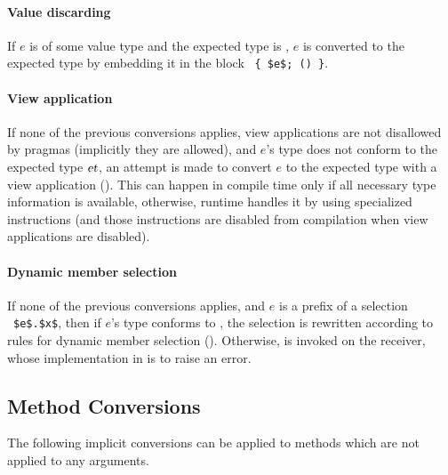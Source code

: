 \paragraph{Value discarding}
If $e$ is of some value type and the expected type is , $e$ is converted to the expected type by embedding it in the block ~\lstinline!{ $e$; () }!. 

\paragraph{View application}
If none of the previous conversions applies, view applications are not disallowed by pragmas (implicitly they are allowed), and $e$'s type does not conform to the expected type $\mbox{\sl et}$, an attempt is made to convert $e$ to the expected type with a view application (). This can happen in compile time only if all necessary type information is available, otherwise, runtime handles it by using specialized instructions (and those instructions are disabled from compilation when view applications are disabled). 

\paragraph{Dynamic member selection}
If none of the previous conversions applies, and $e$ is a prefix of a selection ~\lstinline!$e$.$x$!, then if $e$'s type conforms to , the selection is rewritten according to rules for dynamic member selection (). Otherwise,  is invoked on the receiver, whose implementation in  is to raise an error. 






\subsection{Method Conversions}
\label{sec:method-conversions}

The following implicit conversions can be applied to methods which are not applied to any arguments. 

